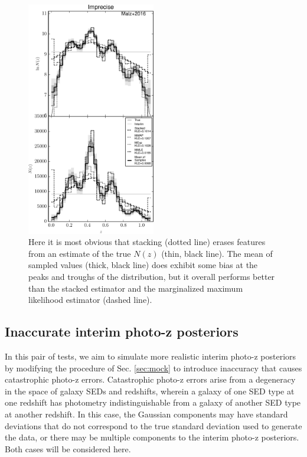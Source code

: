 \documentclass[preprint]{aastex}
\begin{document}
\begin{figure}
\includegraphics[width=0.5\textwidth]{figs/sig4/comps.pdf}
\caption{Here it is most obvious that stacking (dotted line) erases features 
from an estimate of the true $N(z)$ (thin, black line).  The mean of sampled 
values (thick, black line) does exhibit some bias at the peaks and troughs of 
the distribution, but it overall performs better than the stacked estimator and 
the marginalized maximum likelihood estimator (dashed line).}
\label{fig:sig4-comp}
\end{figure}

\clearpage
\subsection{Inaccurate interim photo-z posteriors}
\label{sec:multi}

In this pair of tests, we aim to simulate more realistic interim photo-z 
posteriors by modifying the procedure of Sec. \ref{sec:mock} to introduce 
inaccuracy that causes catastrophic photo-z errors.  Catastrophic photo-z 
errors arise from a degeneracy in the space of galaxy SEDs and redshifts, 
wherein a galaxy of one SED type at one redshift has photometry 
indistinguishable from a galaxy of another SED type at another redshift.  In 
this case, the Gaussian components may have standard deviations that do not 
correspond to the true standard deviation used to generate the data, or there 
may be multiple components to the interim photo-z posteriors.  Both cases will 
be considered here.
\end{document}
